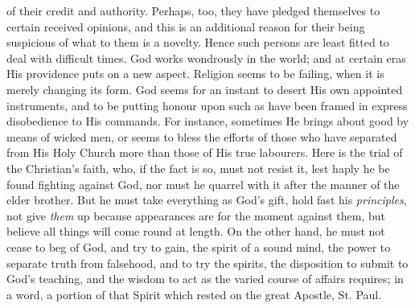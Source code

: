 of their credit and authority. Perhaps, too, they have pledged
themselves to certain received opinions, and this is an additional
reason for their being suspicious of what to them is a novelty. Hence
such persons are least fitted to deal with difficult times. God works
wondrously in the world; and at certain eras His providence puts on a
new aspect. Religion seems to be failing, when it is merely changing
its form. God seems for an instant to desert His own appointed
instruments, and to be putting honour upon such as have been framed in
express disobedience to His commands. For instance, sometimes He
brings about good by means of wicked men, or seems to bless the
efforts of those who have separated from His Holy Church more than
those of His true labourers. Here is the trial of the Christian's
faith, who, if the fact is so, must not resist it, lest haply he be
found fighting against God, nor must he quarrel with it after the
manner of the elder brother. But he must take everything as God's
gift, hold fast his \emph{principles}, not give \emph{them} up because
appearances are for the moment against them, but believe all things
will come round at length. On the other hand, he must not cease to beg
of God, and try to gain, the spirit of a sound mind, the power to
separate truth from falsehood, and to try the spirits, the disposition
to submit to God's teaching, and the wisdom to act as the varied
course of affairs requires; in a word, a portion of that Spirit which
rested on the great Apostle, St. Paul.

